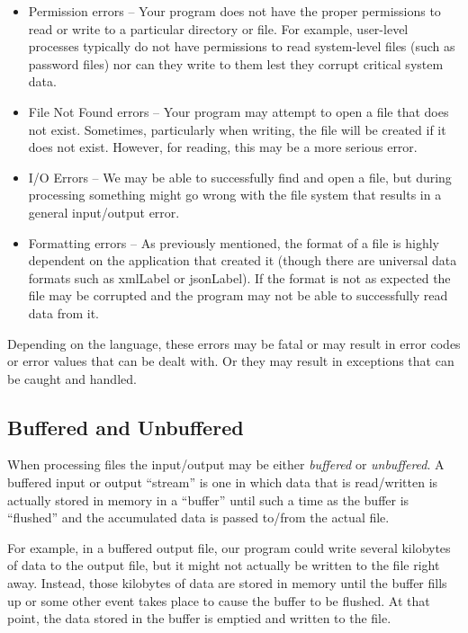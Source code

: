 \begin{itemize}
  \item Permission errors -- Your program does not have
  	the proper permissions to read or write to a particular
	directory or file.  For example, user-level processes
	typically do not have permissions to read system-level
	files (such as password files) nor can they write to them
	lest they corrupt critical system data.  
  \item File Not Found errors -- Your program may attempt
  	to open a file that does not exist.  Sometimes, particularly
	when writing, the file will be created if it does not 
	exist.  However, for reading, this may be a more
	serious error.
  \item I/O Errors -- We may be able to successfully find
  	and open a file, but during processing something might
	go wrong with the file system that results in a general
	input/output error.
  \item Formatting errors -- As previously mentioned, the
  	format of a file is highly dependent on the application
	that created it (though there are universal data formats
	such as \gls{xmlLabel} or \gls{jsonLabel}).  If the
	format is not as expected the file may be corrupted and
	the program may not be able to successfully read 
	data from it.
\end{itemize}

Depending on the language, these errors may be fatal or may
result in error codes or error values that can be dealt with.
Or they may result in exceptions that can be caught and handled.

\subsection{Buffered and Unbuffered}

When processing files the input/output may be either 
\emph{buffered} or \emph{unbuffered}.  A buffered input or
output ``stream'' is one in which data that is read/written
is actually stored in memory in a ``buffer'' until such a 
time as the buffer is ``flushed'' and the accumulated data
is passed to/from the actual file.  

For example, in a buffered output file, our program could
write several kilobytes of data to the output file, but it
might not actually be written to the file right away.  Instead,
those kilobytes of data are stored in memory until the
buffer fills up or some other event takes place to cause the
buffer to be flushed.  At that point, the data stored in the
buffer is emptied and written to the file.

